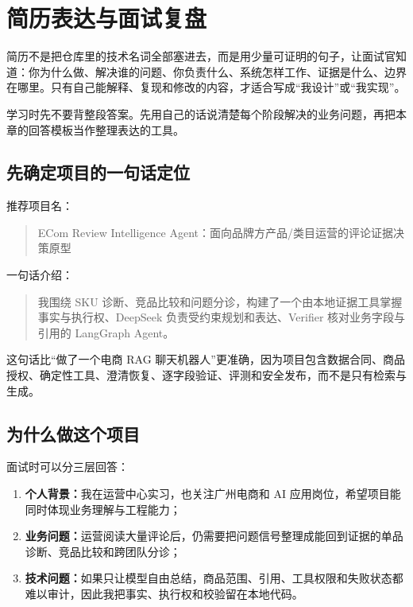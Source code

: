 \chapter{简历表达与面试复盘}

\begin{beginnerbox}
简历不是把仓库里的技术名词全部塞进去，而是用少量可证明的句子，让面试官知道：你为什么做、解决谁的问题、你负责什么、系统怎样工作、证据是什么、边界在哪里。只有自己能解释、复现和修改的内容，才适合写成“我设计”或“我实现”。

学习时先不要背整段答案。先用自己的话说清楚每个阶段解决的业务问题，再把本章的回答模板当作整理表达的工具。
\end{beginnerbox}

\section{先确定项目的一句话定位}

推荐项目名：

\begin{quote}
ECom Review Intelligence Agent：面向品牌方产品/类目运营的评论证据决策原型
\end{quote}

一句话介绍：

\begin{quote}
我围绕 SKU 诊断、竞品比较和问题分诊，构建了一个由本地证据工具掌握事实与执行权、DeepSeek 负责受约束规划和表达、Verifier 核对业务字段与引用的 LangGraph Agent。
\end{quote}

这句话比“做了一个电商 RAG 聊天机器人”更准确，因为项目包含数据合同、商品授权、确定性工具、澄清恢复、逐字段验证、评测和安全发布，而不是只有检索与生成。

\section{为什么做这个项目}

面试时可以分三层回答：

\begin{enumerate}
  \item \textbf{个人背景：}我在运营中心实习，也关注广州电商和 AI 应用岗位，希望项目能同时体现业务理解与工程能力；
  \item \textbf{业务问题：}运营阅读大量评论后，仍需要把问题信号整理成能回到证据的单品诊断、竞品比较和跨团队分诊；
  \item \textbf{技术问题：}如果只让模型自由总结，商品范围、引用、工具权限和失败状态都难以审计，因此我把事实、执行权和校验留在本地代码。
\end{enumerate}

